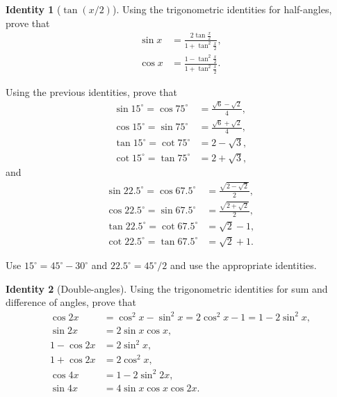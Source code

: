 \documentclass[12pt,a4paper]{memoir}
\theoremstyle{definition}
\newtheorem{identity}{Identity}
\begin{document}
\begin{identity}[$\tan(x/2)$]
	Using the trigonometric identities for half-angles, prove that
	\begin{align}
		\sin x &= \frac{\displaystyle 2 \tan \frac{x}{2}}{\displaystyle 1 + \tan^2 \frac{x}{2}},\\
		\cos x &= \frac{\displaystyle 1 - \tan^2 \frac{x}{2}}{\displaystyle 1 + \tan^2 \frac{x}{2}}.
	\end{align}
\end{identity}

\begin{question}
	Using the previous identities, prove that
	\begin{align*}
		\sin 15^{\circ}  = \cos 75^{\circ} &= \frac{\sqrt 6 - \sqrt 2}{4},\\
		\cos 15^{\circ}  = \sin 75^{\circ}  &= \frac{\sqrt 6 + \sqrt 2}{4},\\
		\tan 15^{\circ} = \cot 75^{\circ} &= 2 - \sqrt 3,\\
		\cot 15^{\circ} = \tan 75^{\circ} &= 2 + \sqrt 3,
	\end{align*}
	and
	\begin{align*}
		\sin 22.5^{\circ}  = \cos 67.5^{\circ} &= \frac{\sqrt{2-\sqrt 2}}{2},\\
		\cos 22.5^{\circ}  = \sin 67.5^{\circ} &= \frac{\sqrt{2+\sqrt 2}}{2},\\
		\tan 22.5^{\circ} = \cot 67.5^{\circ} &= \sqrt 2 - 1,\\
		\cot 22.5^{\circ} = \tan 67.5^{\circ} &= \sqrt 2 + 1.
	\end{align*}
\end{question}

\begin{solution}
	Use $15^{\circ} = 45^{\circ} - 30^{\circ}$ and $22.5^{\circ} = 45^{\circ}/2$ and use the appropriate identities.
\end{solution}


\begin{identity}[Double-angles]
	Using the trigonometric identities for sum and difference of angles, prove that
	\begin{align}
		\cos 2x &= \cos^2 x - \sin^2 x = 2\cos^2 x - 1 =1 - 2\sin^2 x, \label{cos-double-angle}\\
		\sin 2x &= 2 \sin x \cos x, \label{sin-double-angle}\\
		1 - \cos 2x &= 2 \sin^2 x, \label{1-cos2x}\\
		1 + \cos 2x &= 2 \cos^2 x, \label{1+cos2x}\\
		\cos 4x &= 1 -2\sin^2 2x, \label{cos4x}\\
		\sin 4x &= 4 \sin x \cos x \cos 2x. \label{sin4x}
	\end{align}
\end{identity}
\end{document}
